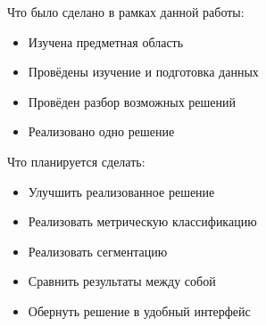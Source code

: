 \documentclass[14pt]{matmex-diploma}
\begin{document}
    Что было сделано в рамках данной работы:
    
    \begin{itemize}
        \item Изучена предметная область
        \item Провёдены изучение и подготовка данных
        \item Провёден разбор возможных решений
        \item Реализовано одно решение 
    \end{itemize}      
        
    Что планируется сделать:
    
    \begin{itemize}
        \item Улучшить реализованное решение
        \item Реализовать метрическую классификацию
        \item Реализовать сегментацию
        \item Сравнить результаты между собой
        \item Обернуть решение в удобный интерфейс
    \end{itemize}      


\setmonofont[Mapping=tex-text]{CMU Typewriter Text}


\end{document}
